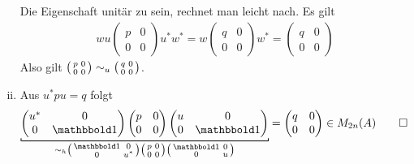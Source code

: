 \begin{beweis}
\begin{enumerate}[(i)]
\[		\]
		Die Eigenschaft unitär zu sein, rechnet man leicht nach.
		Es gilt
		\begin{align}
			w u \begin{pmatrix} p & 0 \\ 0 & 0 \end{pmatrix} u^* w^* = w \begin{pmatrix} q & 0 \\ 0 & 0 \end{pmatrix}w^* = \begin{pmatrix} q & 0 \\ 0 & 0 \end{pmatrix}
		\end{align}
		Also gilt $\begin{psmallmatrix} p & 0 \\ 0 & 0 \end{psmallmatrix} \sim_u \begin{psmallmatrix} q & 0 \\ 0 & 0 \end{psmallmatrix}$.
		\item Aus $u^*pu=q$ folgt 
		\[
			\Underbracket{\begin{pmatrix}
				u^* & 0 \\ 0 & \ind
			\end{pmatrix} \begin{pmatrix}
				p & 0 \\ 0 & 0
			\end{pmatrix} \begin{pmatrix}
				u & 0 \\ 0 & \ind
			\end{pmatrix}}{\sim_h \begin{psmallmatrix}
				\ind & 0 \\ 0 & u^*
			\end{psmallmatrix} \begin{psmallmatrix}
				p & 0 \\ 0 & 0
			\end{psmallmatrix} \begin{psmallmatrix}
				\ind & 0 \\ 0 & u
			\end{psmallmatrix}} = \begin{pmatrix}
				q & 0 \\0 & 0
			\end{pmatrix} \in M_{2n}(A) \qedhere
		\]
	\end{enumerate}
\end{beweis}

